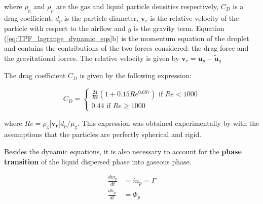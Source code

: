 
where $\rho_\mathrm{g}$ and $\rho_p$ are the gas and liquid particle densities respectively, $C_D$ is a drag coefficient, $d_p$ is the particle diameter, $\boldsymbol{v}_r$ is the relative velocity of the particle with respect to the airflow and $g$ is the gravity term. Equation (\ref{eq:TPF_lagrange_dynamic_eqs}b) is the momentum equation of the droplet and contains the contributions of the two forces considered: the drag force and the gravitational forces. The relative velocity is given by $\boldsymbol{v}_r = \boldsymbol{u}_p - \widetilde{\boldsymbol{u}}_g$ 

The drag coefficient $C_D$ is given by the following expression:

\begin{equation}
\label{eq:Re_CD_droplet}
C_D =
\left\{
    \begin{split}
     \frac{24}{Re} \left( 1 + 0.15 Re^{0.687} \right)\,\,\mathrm{if}\,\,Re < 1000 \\ 
    0.44\,\,\mathrm{if}\,\,Re \geq 1000 
    \end{split}
\right.
\end{equation}

where $Re = \rho_\mathrm{g} | \boldsymbol{v_r} | d_p / \mu_\mathrm{g} $. This expression was obtained experimentally by  with the assumptions that the particles are perfectly spherical and rigid.  



Besides the dynamic equations, it is also necessary to account for the \textbf{phase transition} of the liquid dispersed phase into gaseous phase. 

\begin{subequations}
\label{eq:TPF_lagrange_phasetransition_eqs}
\begin{align}
\frac{d m_p}{d t} &= \dot{m}_p = \Gamma \\
\frac{d h_p}{d t} &= \Phi_p
\end{align}
\end{subequations}


